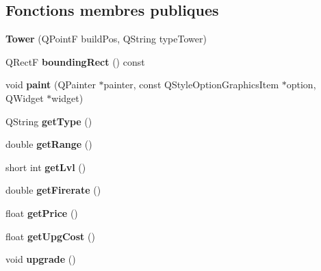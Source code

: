 \subsection*{Fonctions membres publiques}
\begin{DoxyCompactItemize}
\item 
\hypertarget{classTower_a7f9ceffca6b5ac42bd49619175cd5a22}{
{\bfseries Tower} (QPointF buildPos, QString typeTower)}
\label{classTower_a7f9ceffca6b5ac42bd49619175cd5a22}

\item 
\hypertarget{classTower_a8fc14fa547a388fa8500f39551019d87}{
QRectF {\bfseries boundingRect} () const }
\label{classTower_a8fc14fa547a388fa8500f39551019d87}

\item 
\hypertarget{classTower_ad0804070755704b426ef9edaadc58e46}{
void {\bfseries paint} (QPainter $\ast$painter, const QStyleOptionGraphicsItem $\ast$option, QWidget $\ast$widget)}
\label{classTower_ad0804070755704b426ef9edaadc58e46}

\item 
\hypertarget{classTower_a0e330af9db954014fc40c2b5533095a1}{
QString {\bfseries getType} ()}
\label{classTower_a0e330af9db954014fc40c2b5533095a1}

\item 
\hypertarget{classTower_ad56d1012706fe2b0d189bc5b3c0bdaad}{
double {\bfseries getRange} ()}
\label{classTower_ad56d1012706fe2b0d189bc5b3c0bdaad}

\item 
\hypertarget{classTower_afefd70c063a5e89d2490c3b4824d9684}{
short int {\bfseries getLvl} ()}
\label{classTower_afefd70c063a5e89d2490c3b4824d9684}

\item 
\hypertarget{classTower_abee41b219b8d886e34e4a7c9087d80fc}{
double {\bfseries getFirerate} ()}
\label{classTower_abee41b219b8d886e34e4a7c9087d80fc}

\item 
\hypertarget{classTower_a604ad233aaa46b85c8dfddc142154697}{
float {\bfseries getPrice} ()}
\label{classTower_a604ad233aaa46b85c8dfddc142154697}

\item 
\hypertarget{classTower_a67d7ca07ddc7b0fec53ca0c2b48295e9}{
float {\bfseries getUpgCost} ()}
\label{classTower_a67d7ca07ddc7b0fec53ca0c2b48295e9}

\item 
\hypertarget{classTower_ac732f3dd9c995a84da0ada08b8346f8f}{
void {\bfseries upgrade} ()}
\label{classTower_ac732f3dd9c995a84da0ada08b8346f8f}

\end{DoxyCompactItemize}
